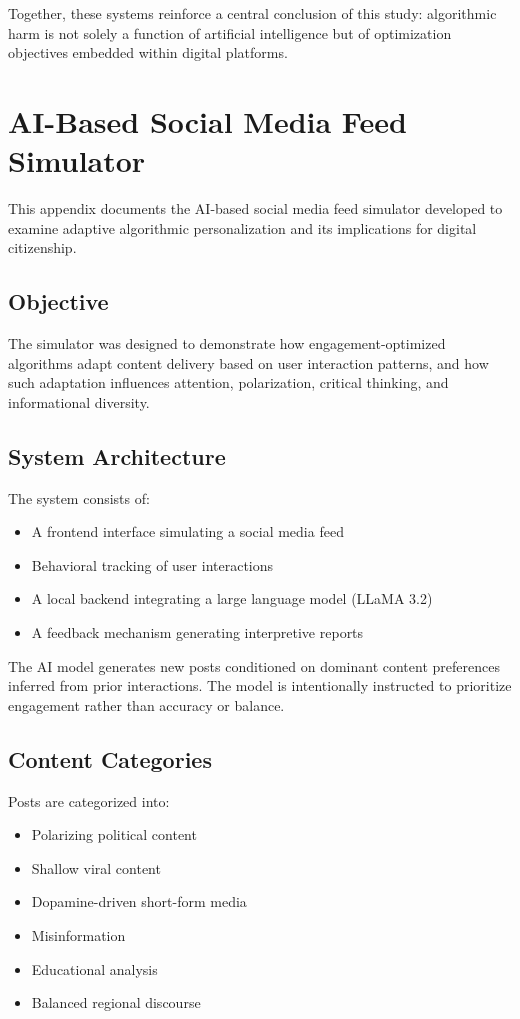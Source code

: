 \documentclass[12pt,a4paper]{report}
\begin{document}
Together, these systems reinforce a central conclusion of this study: algorithmic harm is not solely a function of artificial intelligence but of optimization objectives embedded within digital platforms.



\chapter{AI-Based Social Media Feed Simulator}
\label{app:ai_simulator}

This appendix documents the AI-based social media feed simulator developed to examine adaptive algorithmic personalization and its implications for digital citizenship.

\section{Objective}

The simulator was designed to demonstrate how engagement-optimized algorithms adapt content delivery based on user interaction patterns, and how such adaptation influences attention, polarization, critical thinking, and informational diversity.

\section{System Architecture}

The system consists of:
\begin{itemize}
    \item A frontend interface simulating a social media feed
    \item Behavioral tracking of user interactions
    \item A local backend integrating a large language model (LLaMA 3.2)
    \item A feedback mechanism generating interpretive reports
\end{itemize}

The AI model generates new posts conditioned on dominant content preferences inferred from prior interactions. The model is intentionally instructed to prioritize engagement rather than accuracy or balance.

\section{Content Categories}

Posts are categorized into:
\begin{itemize}
    \item Polarizing political content
    \item Shallow viral content
    \item Dopamine-driven short-form media
    \item Misinformation
    \item Educational analysis
    \item Balanced regional discourse
\end{itemize}
\end{document}
